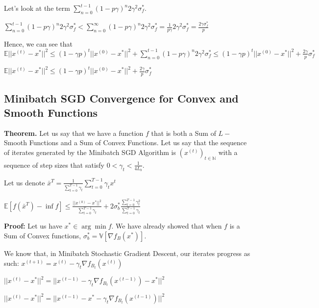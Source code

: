 Let's look at the term $\sum_{n=0}^{t - 1} (1 - p\gamma)^n 2\gamma^2 \sigma_f^*$. 

$\sum_{n=0}^{t - 1} (1 - p\gamma)^n 2\gamma^2 \sigma_f^* < \sum_{n=0}^{\infty} (1 - p\gamma)^n 2\gamma^2 \sigma_f^* = \frac{1}{p\gamma} 2\gamma^2 \sigma_f^* = \frac{2\gamma \sigma_f^*}{p}$

Hence, we can see that \newline 
$\mathbb{E}||x^{(t)} - x^*||^2 \leq (1 - \gamma p)^t ||x^{(0)} - x^*||^2 + \sum_{n=0}^{t - 1} (1 - p\gamma)^n 2\gamma^2 \sigma_f^* \leq (1 - \gamma p)^t ||x^{(0)} - x^*||^2 + \frac{2 \gamma}{p} \sigma_f^*$

$\mathbb{E}||x^{(t)} - x^*||^2 \leq (1 - \gamma p)^t ||x^{(0)} - x^*||^2 + \frac{2 \gamma}{p} \sigma_f^*$

\subsection{Minibatch SGD Convergence for Convex and Smooth Functions}
\noindent \textbf{Theorem.} Let us say that we have a function $f$ that is both a Sum of $L-$Smooth Functions and a Sum of Convex Functions. Let us say that the sequence of iterates generated by the Minibatch SGD Algorithm is $(x^{(t)})_{t \in \mathbb{N}}$ with a sequence of step sizes that satisfy $0 < \gamma_t < \frac{1}{4L_{b}}$. 

Let us denote $\bar{x}^T = \frac{1}{\sum_{t = 0}^{T - 1} \gamma_t} \sum_{t = 0}^{T - 1} \gamma_t x^t$ \newline 

$\mathbb{E}[f(\bar{x}^T) - \inf f] \leq \frac{||x^{(0)} - x^*||^2}{\sum_{t = 0}^{T - 1} \gamma_t} + 2\sigma_b^* \frac{\sum_{t = 0}^{T - 1} \gamma_t^2}{\sum_{t = 0}^{T - 1} \gamma_t}$

\noindent \textbf{Proof:} \newline 
Let us have $x^* \in \arg \min f$. We have already showed that when $f$ is a Sum of Convex functions, $\sigma_b^* = \mathbb{V}[\nabla f_B(x^*)]$. 

We know that, in Minibatch Stochastic Gradient Descent, our iterates progress as such: $x^{(t + 1)}  = x^{(t)} - \gamma_t \nabla f_{B_t}(x^{(t)})$ \newline 

$||x^{(t)} - x^*||^2 = ||x^{(t - 1)} - \gamma_t \nabla f_{B_t}(x^{(t - 1)}) - x^*||^2$ \newline 

$||x^{(t)} - x^*||^2 = ||x^{(t - 1)} - x^* - \gamma_t \nabla f_{B_t}(x^{(t - 1)})||^2$ \newline 

